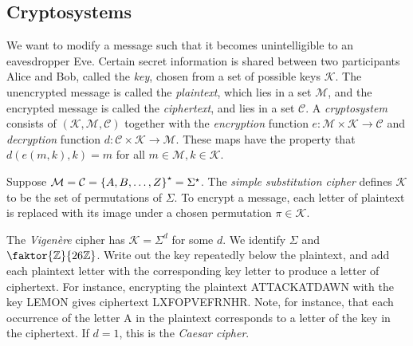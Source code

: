 \subsection{Cryptosystems}
We want to modify a message such that it becomes unintelligible to an eavesdropper Eve.
Certain secret information is shared between two participants Alice and Bob, called the \emph{key}, chosen from a set of possible keys \( \mathcal K \).
The unencrypted message is called the \emph{plaintext}, which lies in a set \( \mathcal M \), and the encrypted message is called the \emph{ciphertext}, and lies in a set \( \mathcal C \).
A \emph{cryptosystem} consists of \( (\mathcal K, \mathcal M, \mathcal C) \) together with the \emph{encryption} function \( e \colon \mathcal M \times \mathcal K \to \mathcal C \) and \emph{decryption} function \( d \colon \mathcal C \times \mathcal K \to \mathcal M \).
These maps have the property that \( d(e(m, k), k) = m \) for all \( m \in \mathcal M, k \in \mathcal K \).
\begin{example}
    Suppose \( \mathcal M = \mathcal C = \qty{A, B, \dots, Z}^\star = \Sigma^\star \).
    The \emph{simple substitution cipher} defines \( \mathcal K \) to be the set of permutations of \( \Sigma \).
    To encrypt a message, each letter of plaintext is replaced with its image under a chosen permutation \( \pi \in \mathcal K \).

    The \emph{Vigen\`ere} cipher has \( \mathcal K = \Sigma^d \) for some \( d \).
    We identify \( \Sigma \) and \( \faktor{\mathbb Z}{26\mathbb Z} \).
    Write out the key repeatedly below the plaintext, and add each plaintext letter with the corresponding key letter to produce a letter of ciphertext.
    For instance, encrypting the plaintext ATTACKATDAWN with the key LEMON gives ciphertext LXFOPVEFRNHR.
    Note, for instance, that each occurrence of the letter A in the plaintext corresponds to a letter of the key in the ciphertext.
    If \( d = 1 \), this is the \emph{Caesar cipher}.
\end{example}

